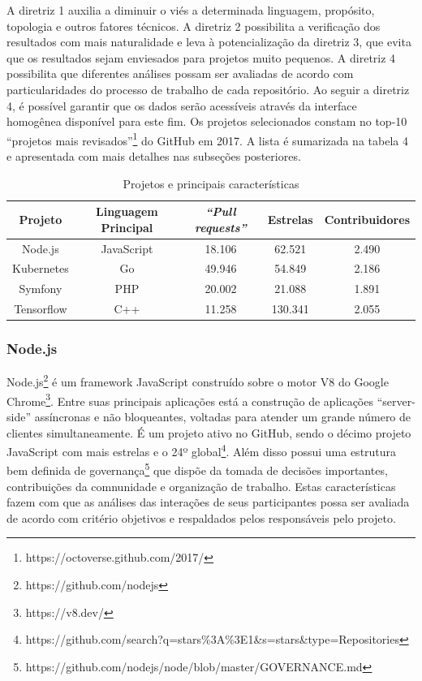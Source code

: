 \documentclass[12pt,openany,oneside,a4paper,english,brazil]{abntbibufjf}
\begin{document}
  A diretriz 1 auxilia a diminuir o viés a determinada linguagem, propósito, topologia e outros fatores técnicos. A diretriz 2 possibilita a verificação dos resultados com mais naturalidade e leva à potencialização da diretriz 3, que evita que os resultados sejam enviesados para projetos muito pequenos. A diretriz 4 possibilita que diferentes análises possam ser avaliadas de acordo com particularidades do processo de trabalho de cada repositório. Ao seguir a diretriz 4, é possível garantir que os dados serão acessíveis através da interface homogênea disponível para este fim.  Os projetos selecionados constam no top-10 ``projetos mais revisados''\footnote{https://octoverse.github.com/2017/} do GitHub em 2017. A lista é  sumarizada na tabela 4 e apresentada com mais detalhes nas subseções posteriores.

  \begin{table}[htbp]
  \caption{Projetos e principais características}
  \begin{center}
  \begin{tabular}{|c|c|c|c|c|}
  \hline
  \textbf{Projeto} & \textbf{Linguagem Principal} & \textbf{\textit{``Pull requests''}}& \textbf{Estrelas}& \textbf{Contribuidores} \\
  \hline
  Node.js & JavaScript & 18.106 & 62.521 & 2.490 \\
  Kubernetes & Go & 49.946 & 54.849 & 2.186 \\
  Symfony & PHP & 20.002 & 21.088 & 1.891 \\
  Tensorflow & C++ & 11.258 & 130.341 & 2.055 \\
  \hline
  \end{tabular}
  \label{tab:sizemetrics}
  \end{center}
  \end{table}

  \subsubsection{Node.js}

  Node.js\footnote{https://github.com/nodejs} é um framework JavaScript construído sobre o motor V8 do Google Chrome\footnote{https://v8.dev/}. Entre suas principais aplicações está a construção de aplicações ``server-side'' assíncronas e não bloqueantes, voltadas para atender um grande número de clientes simultaneamente. É um projeto ativo no GitHub, sendo o décimo projeto JavaScript com mais estrelas e o 24º global\footnote{https://github.com/search?q=stars\%3A\%3E1\&s=stars\&type=Repositories}. Além disso possui uma estrutura bem definida de governança\footnote{https://github.com/nodejs/node/blob/master/GOVERNANCE.md} que dispõe da tomada de decisões importantes, contribuições da comnunidade e organização de trabalho. Estas características fazem com que as análises das interações de seus participantes possa ser avaliada de acordo com critério objetivos e respaldados pelos responsáveis pelo projeto.
\end{document}
